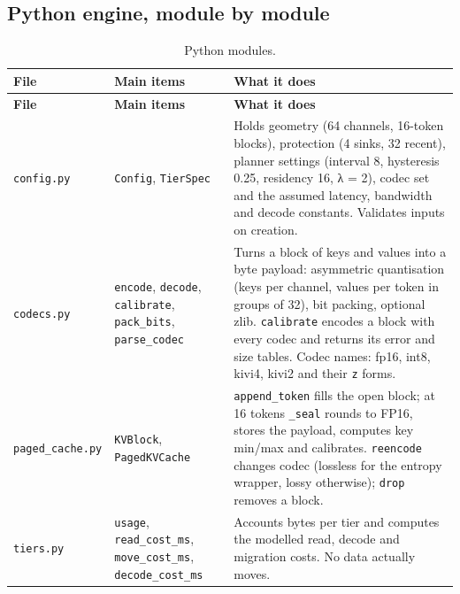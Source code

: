 \documentclass[12pt,a4paper]{report}
\begin{document}
\subsection{Python engine, module by module}\label{sec:6_2}
{\fontsize{8}{9.5}\selectfont\setlength{\tabcolsep}{3pt}
\begin{longtable}{>{\raggedright\arraybackslash}p{1.08in}>{\raggedright\arraybackslash}p{1.54in}>{\raggedright\arraybackslash}p{3.34in}}
\caption{Python modules.}\\
\toprule
\textbf{File} & \textbf{Main items} & \textbf{What it does} \\\midrule\endfirsthead
\toprule \textbf{File} & \textbf{Main items} & \textbf{What it does} \\\midrule\endhead
\bottomrule\endfoot
\texttt{config.\allowbreak{}py} & \texttt{Config}, \texttt{TierSpec} & Holds geometry (64 channels, 16-token blocks), protection (4 sinks, 32 recent), planner settings (interval 8, hysteresis 0.25, residency 16, λ = 2), codec set and the assumed latency, bandwidth and decode constants. Validates inputs on creation. \\
\texttt{codecs.\allowbreak{}py} & \texttt{encode}, \texttt{decode}, \texttt{calibrate}, \texttt{pack\_\allowbreak{}\allowbreak{}bits}, \texttt{parse\_\allowbreak{}\allowbreak{}codec} & Turns a block of keys and values into a byte payload: asymmetric quantisation (keys per channel, values per token in groups of 32), bit packing, optional zlib. \texttt{calibrate} encodes a block with every codec and returns its error and size tables. Codec names: fp16, int8, kivi4, kivi2 and their \texttt{z} forms. \\
\texttt{paged\_\allowbreak{}\allowbreak{}cache.\allowbreak{}py} & \texttt{KVBlock}, \texttt{PagedKVCache} & \texttt{append\_\allowbreak{}\allowbreak{}token} fills the open block; at 16 tokens \texttt{\_\allowbreak{}\allowbreak{}seal} rounds to FP16, stores the payload, computes key min/max and calibrates. \texttt{reencode} changes codec (lossless for the entropy wrapper, lossy otherwise); \texttt{drop} removes a block. \\
\texttt{tiers.\allowbreak{}py} & \texttt{usage}, \texttt{read\_\allowbreak{}\allowbreak{}cost\_\allowbreak{}\allowbreak{}ms}, \texttt{move\_\allowbreak{}\allowbreak{}cost\_\allowbreak{}\allowbreak{}ms}, \texttt{decode\_\allowbreak{}\allowbreak{}cost\_\allowbreak{}\allowbreak{}ms} & Accounts bytes per tier and computes the modelled read, decode and migration costs. No data actually moves. \\

\end{longtable}}
\end{document}
